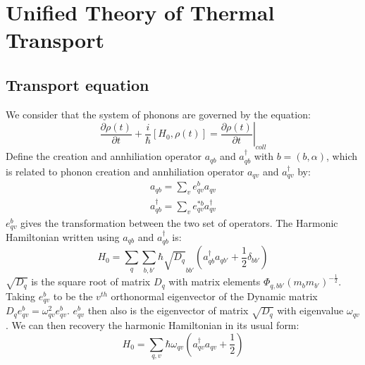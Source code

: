 \documentclass{article}
\begin{document}
\section{Unified Theory of Thermal Transport}
\subsection{Transport equation}
We consider that the system of phonons are governed by the equation:
\begin{equation}
    \frac{\partial \rho(t)}{\partial t} + \frac{i}{\hbar} \left[H_0, \rho(t)\right] = \left. \frac{\partial\rho(t) }{\partial t} \right|_{coll} \label{master}
\end{equation}
Define the creation and annhiliation operator $a_{qb}$ and $a^{\dagger}_{qb}$ with 
$b = (b,\alpha)$, which is related 
to phonon creation and annhiliation operator $a_{qv}$ and $a^{\dagger}_{qv}$ by:
\begin{align}
    a_{qb} = \sum_v e^b_{qv} a_{qv} \\
    a^{\dagger}_{qb} = \sum_v e^{*b}_{qv} a^{\dagger}_{qv}
\end{align}
$e^b_{qv}$ gives the transformation between the two set of operators. 
The Harmonic Hamiltonian written using $a_{qb}$ and $a^{\dagger}_{qb}$ is:
\begin{equation}
    H_0 = \sum_{q} \sum_{b,b'} \hbar \sqrt{D_q}_{bb'} \left( a^{\dagger}_{qb}a_{qb'} + \frac{1}{2} \delta_{bb'} \right)
\end{equation}
$\sqrt{D_q}$ is the square root of matrix $D_q$ with matrix 
elements $\Phi_{q,bb'} (m_b m_{b'})^{-\frac{1}{2}}$.
Taking $e^b_{qv}$ to be the $v^{th}$ orthonormal eigenvector of the 
Dynamic matrix $D_q e^b_{qv} = \omega^2_{qv}e^b_{qv}$. $e^b_{qv}$ then also
is the eigenvector of matrix $\sqrt{D_q}$ with eigenvalue $\omega_{qv}$. We can then recovery
the harmonic Hamiltonian in its usual form:
\begin{equation}
    H_0 = \sum_{q,v} \hbar \omega_{qv} \left( a^{\dagger}_{qv}a_{qv} + \frac{1}{2} \right)
\end{equation}
\end{document}
